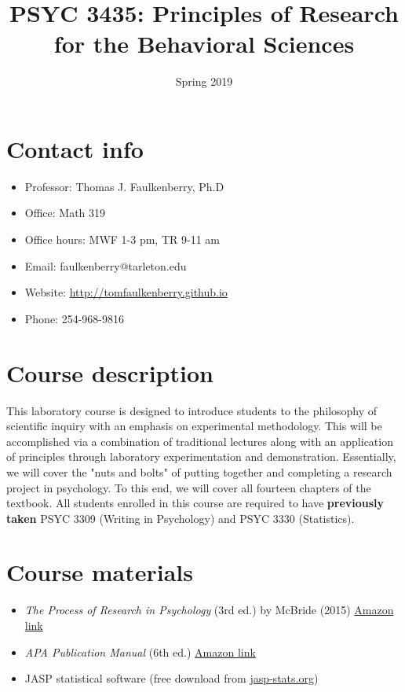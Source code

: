 \documentclass[10pt]{article}
\date{Spring 2019}
\title{PSYC 3435: Principles of Research for the Behavioral Sciences}
\begin{document}
\maketitle

\section*{Contact info}
\label{sec:orgd4f3262}
\begin{itemize}
\item Professor: Thomas J. Faulkenberry, Ph.D
\item Office: Math 319
\item Office hours: MWF 1-3 pm, TR 9-11 am
\item Email: faulkenberry@tarleton.edu
\item Website: \url{http://tomfaulkenberry.github.io}
\item Phone: 254-968-9816
\end{itemize}

\section*{Course description}
\label{sec:orgfd6ae88}

This laboratory course is designed to introduce students to the philosophy of scientific inquiry with an emphasis on experimental methodology. This will be accomplished via a combination of traditional lectures along with an application of principles through laboratory experimentation and demonstration. Essentially, we will cover the "nuts and bolts" of putting together and completing a research project in psychology. To this end, we will cover all fourteen chapters of the textbook. All students enrolled in this course are required to have \textbf{previously taken} PSYC 3309 (Writing in Psychology) and PSYC 3330 (Statistics). 

\section*{Course materials}
\label{sec:org61afd91}

\begin{itemize}
\item \emph{The Process of Research in Psychology} (3rd ed.) by McBride (2015) \href{https://www.amazon.com/Process-Research-Psychology-Dawn-McBride/dp/1483347605/}{Amazon link}
\item \emph{APA Publication Manual} (6th ed.) \href{http://www.amazon.com/Publication-Manual-American-Psychological-Association/dp/1433805618/}{Amazon link}
\item JASP statistical software (free download from \href{http://jasp-stats.org}{jasp-stats.org})
\end{itemize}
\end{document}
